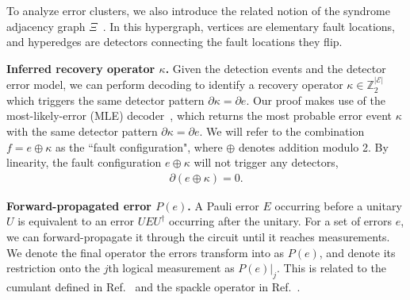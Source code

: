 To analyze error clusters, we also introduce the related notion of the syndrome adjacency graph $\Xi$~\cite{gottesman2013fault}.
%
In this hypergraph, vertices are elementary fault locations, and hyperedges are detectors connecting the fault locations they flip.

\textbf{Inferred recovery operator $\kappa$.}
%
Given the detection events and the detector error model, we can perform decoding to identify a recovery operator $\kappa\in\mathbb{Z}_2^{|\mathcal{E}|}$ which triggers the same detector pattern $\partial\kappa=\partial e.$
%
Our proof makes use of the most-likely-error (MLE) decoder~\cite{landahl2011fault,cain2024correlated,bravyi2015doubled}, which returns the most probable error event $\kappa$ with the same detector pattern $\partial\kappa=\partial e$.
%
We will refer to the combination $f=e \oplus \kappa$ as the ``fault configuration", where $\oplus$ denotes addition modulo 2.
%
By linearity, the fault configuration $e \oplus \kappa$ will not trigger any detectors,
\begin{align}
\partial(e\oplus \kappa)=0. 
\end{align}

\textbf{Forward-propagated error $P(e)$.}
%
A Pauli error $E$ occurring before a unitary $U$ is equivalent to an error $UEU^\dagger$ occurring after the unitary.
%
For a set of errors $e$, we can forward-propagate it through the circuit until it reaches measurements.
%
We denote the final operator the errors transform into as $P(e)$, and denote its restriction onto the $j$th logical measurement as $P(e)|_j$.
%
This is related to the cumulant defined in Ref.~\cite{delfosse2023spacetime} and the spackle operator in Ref.~\cite{bacon2014sparse}.


